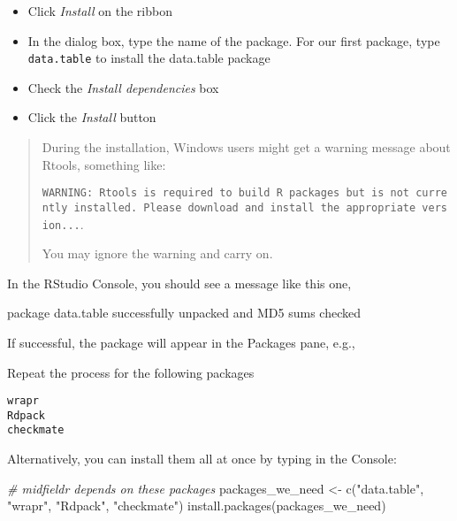 \documentclass[
]{book}
\newenvironment{Shaded}{\begin{snugshade}}{\end{snugshade}}
\newcommand{\CommentTok}[1]{\textcolor[rgb]{0.56,0.35,0.01}{\textit{#1}}}
\newcommand{\FunctionTok}[1]{\textcolor[rgb]{0.00,0.00,0.00}{#1}}
\newcommand{\NormalTok}[1]{#1}
\newcommand{\OtherTok}[1]{\textcolor[rgb]{0.56,0.35,0.01}{#1}}
\newcommand{\StringTok}[1]{\textcolor[rgb]{0.31,0.60,0.02}{#1}}
\providecommand{\tightlist}{%
  \setlength{\itemsep}{0pt}\setlength{\parskip}{0pt}}
\begin{document}
\begin{itemize}
\tightlist
\item
  Click \emph{Install} on the ribbon
\item
  In the dialog box, type the name of the package. For our first package, type \texttt{data.table} to install the data.table package \citep{R-data.table}
\item
  Check the \emph{Install dependencies} box
\item
  Click the \emph{Install} button
\end{itemize}

\begin{quote}
During the installation, Windows users might get a warning message about
Rtools, something like:

\texttt{WARNING:\ Rtools\ is\ required\ to\ build\ R\ packages\ but\ is\ not\ currently\ installed.\ Please\ download\ and\ install\ the\ appropriate\ version...}.

You may ignore the warning and carry on.
\end{quote}

In the RStudio Console, you should see a message like this one,

\begin{Shaded}
\begin{Highlighting}[]
\NormalTok{    package }\StringTok{\textquotesingle{}data.table\textquotesingle{}}\NormalTok{ successfully unpacked and MD5 sums checked}
\end{Highlighting}
\end{Shaded}

If successful, the package will appear in the Packages pane, e.g.,

Repeat the process for the following packages

\begin{verbatim}
wrapr 
Rdpack 
checkmate
\end{verbatim}

Alternatively, you can install them all at once by typing in the Console:

\begin{Shaded}
\begin{Highlighting}[]
\CommentTok{\# midfieldr depends on these packages}
\NormalTok{packages\_we\_need }\OtherTok{\textless{}{-}} \FunctionTok{c}\NormalTok{(}\StringTok{"data.table"}\NormalTok{, }\StringTok{"wrapr"}\NormalTok{, }\StringTok{"Rdpack"}\NormalTok{, }\StringTok{"checkmate"}\NormalTok{)}
\FunctionTok{install.packages}\NormalTok{(packages\_we\_need)}
\end{Highlighting}
\end{Shaded}
\end{document}
